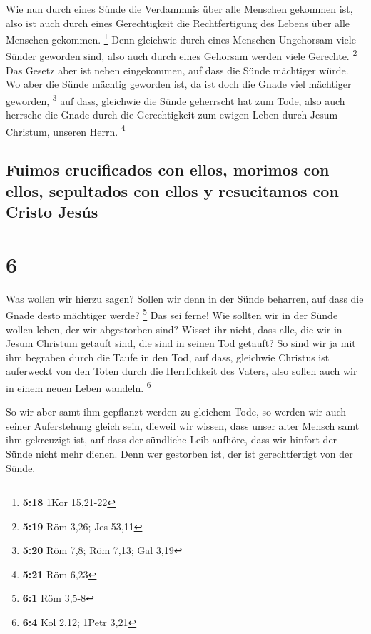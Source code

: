  Wie nun durch eines Sünde die Verdammnis über alle
Menschen gekommen ist, also ist auch durch eines Gerechtigkeit die
Rechtfertigung des Lebens über alle Menschen gekommen. \footnote{\textbf{5:18}
  1Kor 15,21-22}  Denn gleichwie durch eines Menschen
Ungehorsam viele Sünder geworden sind, also auch durch eines Gehorsam
werden viele Gerechte. \footnote{\textbf{5:19} Röm 3,26; Jes 53,11}
 Das Gesetz aber ist neben eingekommen, auf dass die
Sünde mächtiger würde. Wo aber die Sünde mächtig geworden ist, da ist
doch die Gnade viel mächtiger geworden, \footnote{\textbf{5:20} Röm 7,8;
  Röm 7,13; Gal 3,19}  auf dass, gleichwie die Sünde
geherrscht hat zum Tode, also auch herrsche die Gnade durch die
Gerechtigkeit zum ewigen Leben durch Jesum Christum, unseren Herrn.
\footnote{\textbf{5:21} Röm 6,23}

\hypertarget{fuimos-crucificados-con-ellos-morimos-con-ellos-sepultados-con-ellos-y-resucitamos-con-cristo-jesuxfas}{%
\subsection{Fuimos crucificados con ellos, morimos con ellos, sepultados
con ellos y resucitamos con Cristo
Jesús}\label{fuimos-crucificados-con-ellos-morimos-con-ellos-sepultados-con-ellos-y-resucitamos-con-cristo-jesuxfas}}

\hypertarget{section-5}{%
\section{6}\label{section-5}}

 Was wollen wir hierzu sagen? Sollen wir denn in der Sünde
beharren, auf dass die Gnade desto mächtiger werde? \footnote{\textbf{6:1}
  Röm 3,5-8}  Das sei ferne! Wie sollten wir in der Sünde
wollen leben, der wir abgestorben sind?  Wisset ihr nicht,
dass alle, die wir in Jesum Christum getauft sind, die sind in seinen
Tod getauft?  So sind wir ja mit ihm begraben durch die
Taufe in den Tod, auf dass, gleichwie Christus ist auferweckt von den
Toten durch die Herrlichkeit des Vaters, also sollen auch wir in einem
neuen Leben wandeln. \footnote{\textbf{6:4} Kol 2,12; 1Petr 3,21}

 So wir aber samt ihm gepflanzt werden zu gleichem Tode,
so werden wir auch seiner Auferstehung gleich sein, 
dieweil wir wissen, dass unser alter Mensch samt ihm gekreuzigt ist, auf
dass der sündliche Leib aufhöre, dass wir hinfort der Sünde nicht mehr
dienen.  Denn wer gestorben ist, der ist gerechtfertigt
von der Sünde.

